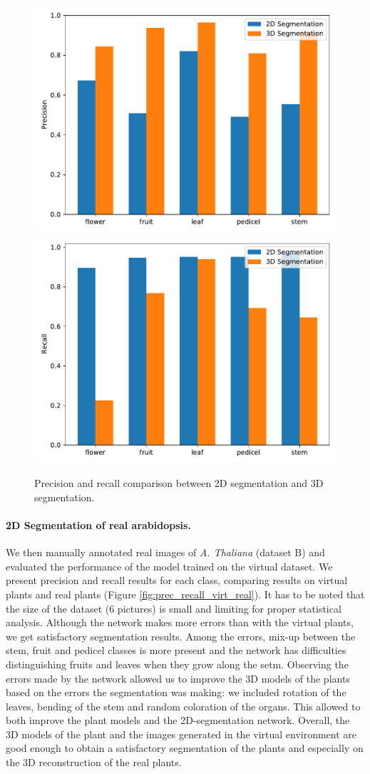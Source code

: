 \begin{figure}[h!]
    \centering \includegraphics[width = 0.5\linewidth]{figures/eval_precision.pdf}\includegraphics[width = 0.5\linewidth]{figures/eval_recall.pdf}
    \caption{Precision and recall comparison between 2D segmentation and 3D
segmentation.} \label{fig:prec_recall_2d_3d}
\end{figure}


\paragraph{2D Segmentation of real arabidopsis.}
 We then manually annotated real images of \emph{A. Thaliana} (dataset B) and evaluated the performance of the model trained on the virtual dataset. We present precision and recall results for each class, comparing results on virtual plants and real plants (Figure \ref{fig:prec_recall_virt_real}). It has to be noted that the size of the dataset (6 pictures) is small and limiting for proper statistical analysis. Although the network makes more errors than with the virtual plants, we get satisfactory segmentation results. Among the errors, mix-up between the stem, fruit and pedicel classes is more present and the network has difficulties distinguishing fruits and leaves when they grow along the setm. Observing the errors made by the network allowed us to improve the 3D models of the plants based on the errors the segmentation was making: we included rotation of the leaves, bending of the stem and random coloration of the organs. This allowed to both improve the plant models and the 2D-segmentation network. Overall, the 3D models of the plant and the images generated in the virtual environment are good enough to obtain a satisfactory segmentation of the plants and especially on the 3D reconstruction of the real plants.\\


